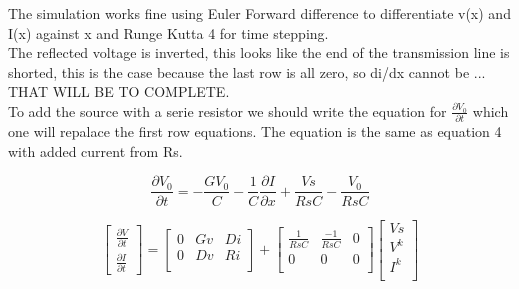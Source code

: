 \documentclass[12pt, letterpaper]{article}
\begin{document}
The simulation works fine using Euler Forward difference to differentiate v(x) and I(x) against x and Runge Kutta 4 for time stepping.\\

The reflected voltage is inverted, this looks like the end of the transmission line is shorted, this is the case because the last row is all zero, so di/dx cannot be ... THAT WILL BE TO COMPLETE.\\

To add the source with a serie resistor we should write the equation for $\frac{\partial{V_0}}{\partial{t}}$ which one will repalace the first row equations. The equation is the same as equation 4 with added current from Rs.



\begin{equation} \frac{\partial{V_0}}{\partial{t}} = -\frac{G V_0}{C} - \frac{1}{C} \frac{\partial{I}}{\partial{x}} + \frac{Vs}{Rs C} - \frac{V_0}{Rs C}
\end{equation}


\begin{equation}
	\begin{bmatrix}
		\frac{\partial{V}}{\partial{t}} \\
		\frac{\partial{I}}{\partial{t}} 
	\end{bmatrix}	
	=
	\begin{bmatrix}
		0 & Gv & Di \\
		0 & Dv & Ri \\
	\end{bmatrix}
	+
		\begin{bmatrix}
		\frac{1}{Rs C} & \frac{-1}{Rs C} & 0 \\
		0 & 0 & 0 \\
	\end{bmatrix}
	\begin{bmatrix}
		Vs \\
		V^k \\
		I^k \\
	\end{bmatrix}
\end{equation}


	
\end{document}
